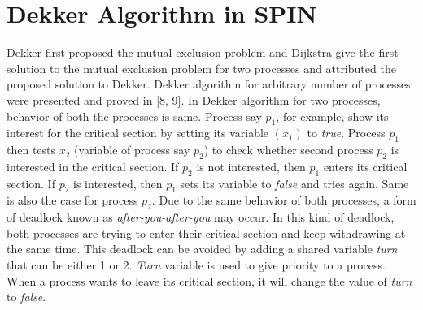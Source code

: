 \documentclass[conference]{IEEEtran}
\begin{document}
\section{Dekker Algorithm in SPIN}
Dekker first proposed the mutual exclusion problem and Dijkstra \cite{8} give the first solution to the mutual exclusion problem for two processes and 
attributed the proposed solution to Dekker. Dekker algorithm for arbitrary number of processes were presented and proved in [8, 9]. 
In Dekker algorithm for two processes, behavior of both the processes is same. Process say $p_1$, for example, show its interest for the critical 
section by setting its variable $(x_1)$ to \emph{true}. Process $p_1$ then tests $x_2$ (variable of process say $p_2$) to check whether second 
process $p_2$ is interested in the critical section. If $p_2$ is not interested, then $p_1$ enters its critical section. If $p_2$ is interested, 
then $p_1$ sets its variable to \emph{false} and tries again. Same is also the case for process $p_2$. Due to the same behavior of both processes, 
a form of deadlock known as \emph{after-you-after-you} may occur. In this kind of deadlock, both processes are trying to enter 
their critical section and keep withdrawing at the same time. This deadlock can be avoided by adding a shared variable \emph{turn} that can be 
either 1 or 2. \emph{Turn} variable is used to give priority to a process. When a process wants to leave its critical section, it will change 
the value of \emph{turn} to \emph{false}. 
\end{document}
